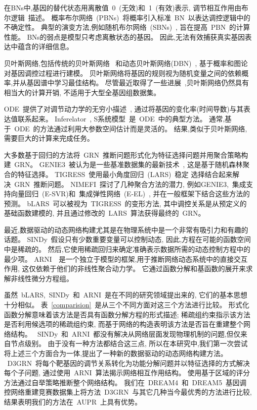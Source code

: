 在BNs中,基因的替代状态用离散值~0~(无效)和~1~(有效)表示,
调节相互作用由布尔逻辑~\cite{kauffman1969homeostasis}描述。
概率布尔网络~(PBNs)~\cite{shmulevich2002probabilistic}将概率引入标准~BN~以表达调控逻辑中的不确定性。
典型的演变方法,例如随机布尔网络~(SBNs)~\cite{liang2012stochastic},
旨在提高~PBN~的计算性能。
BNs的弱点是模型只考虑离散状态的基因。
因此,无法有效捕获真实基因表达中蕴含的详细信息。

贝叶斯网络,包括传统的贝叶斯网络~\cite{friedman2000using,friedman2003being}
和动态贝叶斯网络(DBN)~\cite{grzegorczyk2010improvements},
基于概率和图论对基因调控过程进行建模。
贝叶斯网络将基因的规则视为随机变量之间的依赖概率,并从基因谱中学习最佳结构。
尽管最近取得了一些进展~\cite{hill2012bayesian},贝叶斯网络仍然具有相当大的计算开销,
不适用于大型全基因组数据集。

ODE~提供了对调节动力学的无穷小描述~\cite{chen1999modeling},
通过将基因的变化率(时间导数)与其表达值联系起来。
Inferelator~\cite{bonneau2006inferelator},
S系统模型~\cite{kikuchi2003dynamic,wang2010inference,liu2012inference}是~ODE~中的典型方法。
通常,基于~ODE~的方法通过利用大参数空间估计而是灵活的。
结果,类似于贝叶斯网络,需要巨大的计算来完成任务。

大多数基于回归的方法将~GRN~推断问题形式化为特征选择问题并用聚合策略构建~GRN。
GENIE3~\cite{huynh2010inferring}被认为是一些基准数据集的最新技术~\cite{marbach2010revealing},
这是基于随机森林聚合的特征选择。
TIGRESS~\cite{Haury2012}使用最小角度回归~(LARS)~稳定
选择结合起来解决~GRN~推断问题。
NIMEFI~\cite{ruyssinck2014nimefi}探讨了几种聚合方法的潜力,
例如GENIE3,~集成支持向量回归~(E-SVR)和~集成弹性网络~(E-EL)~\cite{zou2005regularization},
并在一般框架下结合这些方法的预测。
bLARS~\cite{singh2016blars}可以被视为~TIGRESS~的变形方法,
其中调控关系是从预定义的基础函数建模的,
并且通过修改的~LARS~算法获得最终的~GRN。

最近,数据驱动的动态网络构建尤其是在物理系统中是一个非常有吸引力和有趣的话题。
SINDy~\cite{brunton2016discovering}假设只有少数重要变量可以控制动态,
因此,方程在可能的函数空间中是稀疏的。
然后,它使用稀疏回归来确定准确表示数据所需的动态控制方程中的最少项。
ARNI~\cite{casadiego2017model}~是一个独立于模型的框架,用于推断网络动态系统中的直接交互作用,
这仅依赖于他们的非线性聚合动力学。
它通过函数分解和基函数的展开来求解非线性微分方程组。

虽然~bLARS,~SINDy~和~ARNI~是在不同的研究领域提出来的,
它们的基本思想十分相似。
表~\ref{comparision}~是从三个不同方面对这三个方法进行比较。
形式化函数分解意味着该方法是否具有函数分解方程的形式描述;
稀疏组约束指示该方法是否利用候选项的稀疏组约束,
而基于网络的构造表明该方法是否旨在重建整个网络结构。
~SINDy~和~ARNI~都没有解决从网络层面发现物理机制的问题,但仅来自节点级别。
由于没有一种方法都结合​​这三点,
所以在本研究中,我们第一次尝试将上述三个方面合为一体,提出了一种新的数据驱动的动态网络构建方法。
~D3GRN~将每个靶基因的调节关系转化为功能分解问题并以特征选择的方式解决每个子问题,
通过使用~ARNI~算法揭示网络相互作用结构。
使用基于区域的评分方法通过自举策略推断整个网络结构。
我们在~DREAM4~和~DREAM5~基因调控网络重建竞赛数据集上将方法~D3GRN~与其它几种当今最优秀的方法进行比较,
结果表明我们的方法在~AUPR~上具有优势。

